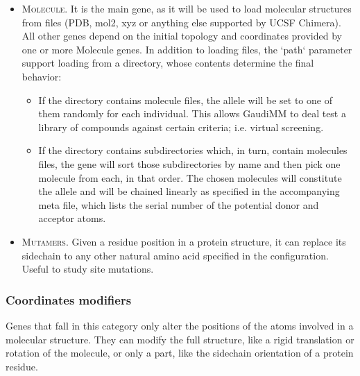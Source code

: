 \begin{itemize}
	\item \textsc{Molecule}. It is the main gene, as it will be used to load molecular structures from files (PDB, mol2, xyz or anything else supported by UCSF Chimera). All other genes depend on the initial topology and coordinates provided by one or more Molecule genes. In addition to loading files, the `path` parameter support loading from a directory, whose contents determine the final behavior:
	\begin{itemize}
		\item If the directory contains molecule files, the allele will be set to one of them randomly for each individual. This allows GaudiMM to deal test a library of compounds against certain criteria; i.e. virtual screening.
		\item If the directory contains subdirectories which, in turn, contain molecules files, the gene will sort those subdirectories by name and then pick one molecule from each, in that order. The chosen molecules will constitute the allele and will be chained linearly as specified in the accompanying meta file, which lists the serial number of the potential donor and acceptor atoms.
	\end{itemize}
	\item \textsc{Mutamers}. Given a residue position in a protein structure, it can replace its sidechain to any other natural amino acid specified in the configuration. Useful to study site mutations.
\end{itemize}

\subsubsection{Coordinates modifiers}
Genes that fall in this category only alter the positions of the atoms involved in a molecular structure. They can modify the full structure, like a rigid translation or rotation of the molecule, or only a part, like the sidechain orientation of a protein residue.

